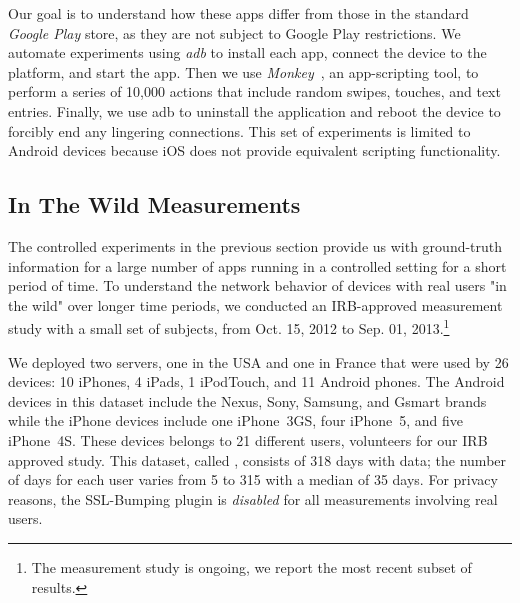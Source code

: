 Our goal is to understand how these apps differ from those in the standard \emph{Google Play} 
store, as they are not subject to Google Play restrictions.
We automate experiments using \emph{adb} to
install each app, connect the device to the \platname{} platform, and
start the app. Then we use \emph{Monkey}~\cite{adbmonkey}, an app-scripting 
tool, to perform a series of 10,000 actions  that include
random swipes, touches, and text entries.  Finally, we use adb to
uninstall the application and reboot the device to forcibly end any
lingering connections. This set of experiments is limited to
Android devices because iOS does not provide equivalent 
scripting functionality. 


\subsection{In The Wild Measurements}
\label{sec:dataset-wild-measurements}

The controlled experiments in the previous section provide us with 
ground-truth information for a large number of apps running in a controlled 
setting for a short period of time. To understand the network behavior of 
devices with real users "in the wild" over longer time periods, we conducted 
an IRB-approved measurement study with a small set of subjects, from 
Oct. 15, 2012 to Sep. 01, 2013.\footnote{The measurement study is ongoing, we report the most recent subset of results.}

We deployed two \platname servers, one in the USA and one in France
that were used by 26 devices: 10 iPhones, 4 iPads, 1 iPodTouch, and 11
Android phones.  The Android devices in this dataset include the
Nexus, Sony, Samsung, and Gsmart brands while the iPhone devices
include one iPhone~3GS, four iPhone~5, and five iPhone~4S.  These
devices belongs to 21 different users, volunteers for our IRB approved
study.  This dataset, called \mobWild, consists of 318 days with data; the number of 
days for each user varies from 5 to 315 with a median of 35 days.  For privacy reasons, the
SSL-Bumping plugin is \emph{disabled} for all measurements involving
real users.

